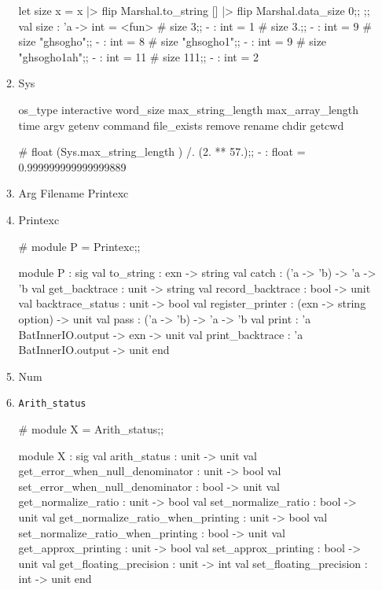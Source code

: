 \begin{enumerate}
\begin{enumerate}
\begin{alternate}
let size x = x |> flip Marshal.to_string [] |> flip Marshal.data_size 0;;           ;;
val size : 'a -> int = <fun>
# size 3;;
- : int = 1
# size 3.;;
- : int = 9
# size "ghsogho";;
- : int = 8
# size "ghsogho1";;
- : int = 9
# size "ghsogho1ah";;
- : int = 11
# size 111;;
- : int = 2
\end{alternate}


    \item Sys

\begin{bluecode}
os_type interactive word_size max_string_length
max_array_length time argv getenv command file_exists
remove rename chdir getcwd 
\end{bluecode}

\begin{alternate}
# float (Sys.max_string_length ) /. (2. ** 57.);;
- : float = 0.999999999999999889
\end{alternate}


    \item Arg Filename Printexc
    \item Printexc

\begin{redcode}
# module P = Printexc;;
\end{redcode}

\begin{bluecode}
module P :
  sig
    val to_string : exn -> string
    val catch : ('a -> 'b) -> 'a -> 'b
    val get_backtrace : unit -> string
    val record_backtrace : bool -> unit
    val backtrace_status : unit -> bool
    val register_printer : (exn -> string option) -> unit
    val pass : ('a -> 'b) -> 'a -> 'b
    val print : 'a BatInnerIO.output -> exn -> unit
    val print_backtrace : 'a BatInnerIO.output -> unit
  end
\end{bluecode}


    \item Num
    \item \verb|Arith_status|

\begin{redcode}
# module X = Arith_status;;
\end{redcode}
\begin{bluecode}
module X :
  sig
    val arith_status : unit -> unit
    val get_error_when_null_denominator : unit -> bool
    val set_error_when_null_denominator : bool -> unit
    val get_normalize_ratio : unit -> bool
    val set_normalize_ratio : bool -> unit
    val get_normalize_ratio_when_printing : unit -> bool
    val set_normalize_ratio_when_printing : bool -> unit
    val get_approx_printing : unit -> bool
    val set_approx_printing : bool -> unit
    val get_floating_precision : unit -> int
    val set_floating_precision : int -> unit
  end
\end{bluecode}



\end{enumerate}
\end{enumerate}
